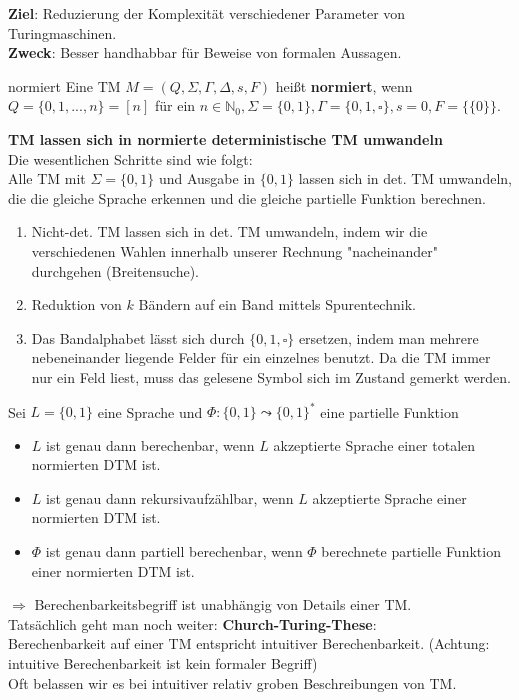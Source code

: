 \textbf{Ziel}: Reduzierung der Komplexität verschiedener Parameter von Turingmaschinen. \\
\textbf{Zweck}: Besser handhabbar für Beweise von formalen Aussagen. \\

\begin{defn}{normiert}
    Eine TM $M = (Q, \Sigma, \Gamma, \Delta, s, F)$ heißt \textbf{normiert}, wenn $Q = \{0,1,...,n\} = [n]$ für ein
    $n \in \mathbb{N}_0, \Sigma = \{0,1\}, \Gamma = \{0,1,\square\}, s=0, F = \{\{0\}\}$.
\end{defn}

\textbf{TM lassen sich in normierte deterministische TM umwandeln} \\

Die wesentlichen Schritte sind wie folgt: \\
Alle TM mit $\Sigma=\{0,1\}$ und Ausgabe in $\{0,1\}$ lassen sich in det. TM umwandeln,
die die gleiche Sprache erkennen und die gleiche partielle Funktion berechnen. \\

\begin{enumerate}
    \item Nicht-det. TM  lassen sich in det. TM umwandeln, indem wir die verschiedenen Wahlen innerhalb 
          unserer Rechnung "nacheinander" durchgehen (Breitensuche).
    \item Reduktion von $k$ Bändern auf ein Band mittels Spurentechnik.
    \item Das Bandalphabet lässt sich durch $\{0,1,\square\}$ ersetzen, indem man mehrere nebeneinander
          liegende Felder für ein einzelnes benutzt. Da die TM immer nur ein Feld liest, muss das 
          gelesene Symbol sich im Zustand gemerkt werden.
\end{enumerate}

\begin{bem}
    Sei $L = \{0,1\}$ eine Sprache und $\Phi : \{0,1\} \leadsto \{0,1\}^*$ eine partielle Funktion
    \begin{itemize}
        \item $L$ ist genau dann berechenbar, wenn $L$ akzeptierte Sprache einer totalen normierten DTM ist.
        \item $L$ ist genau dann rekursivaufzählbar, wenn $L$ akzeptierte Sprache einer normierten DTM ist.
        \item $\Phi$ ist genau dann partiell berechenbar, wenn $\Phi$ berechnete partielle Funktion einer normierten DTM ist.
    \end{itemize}
    $\Rightarrow$ Berechenbarkeitsbegriff ist unabhängig von Details einer TM. \\
    
    Tatsächlich geht man noch weiter: \textbf{Church-Turing-These}: \\
    Berechenbarkeit auf einer TM entspricht intuitiver Berechenbarkeit. (Achtung: intuitive Berechenbarkeit ist kein formaler Begriff) \\
    
    Oft belassen wir es bei intuitiver relativ groben Beschreibungen von TM.
\end{bem}


